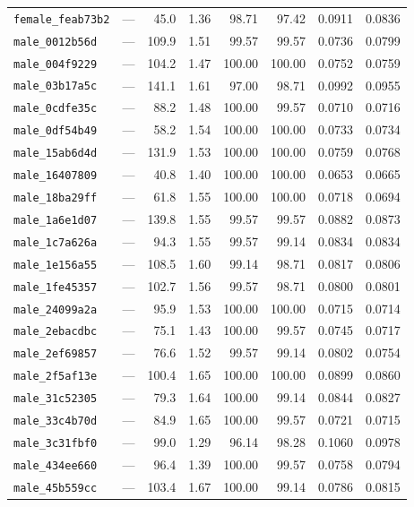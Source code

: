 \begin{longtable}{lrrrrrrr}
\texttt{female\_feab73b2} & --- & 45.0 & 1.36 & 98.71 & 97.42 & 0.0911 & 0.0836 \\
\texttt{male\_0012b56d} & --- & 109.9 & 1.51 & 99.57 & 99.57 & 0.0736 & 0.0799 \\
\texttt{male\_004f9229} & --- & 104.2 & 1.47 & 100.00 & 100.00 & 0.0752 & 0.0759 \\
\texttt{male\_03b17a5c} & --- & 141.1 & 1.61 & 97.00 & 98.71 & 0.0992 & 0.0955 \\
\texttt{male\_0cdfe35c} & --- & 88.2 & 1.48 & 100.00 & 99.57 & 0.0710 & 0.0716 \\
\texttt{male\_0df54b49} & --- & 58.2 & 1.54 & 100.00 & 100.00 & 0.0733 & 0.0734 \\
\texttt{male\_15ab6d4d} & --- & 131.9 & 1.53 & 100.00 & 100.00 & 0.0759 & 0.0768 \\
\texttt{male\_16407809} & --- & 40.8 & 1.40 & 100.00 & 100.00 & 0.0653 & 0.0665 \\
\texttt{male\_18ba29ff} & --- & 61.8 & 1.55 & 100.00 & 100.00 & 0.0718 & 0.0694 \\
\texttt{male\_1a6e1d07} & --- & 139.8 & 1.55 & 99.57 & 99.57 & 0.0882 & 0.0873 \\
\texttt{male\_1c7a626a} & --- & 94.3 & 1.55 & 99.57 & 99.14 & 0.0834 & 0.0834 \\
\texttt{male\_1e156a55} & --- & 108.5 & 1.60 & 99.14 & 98.71 & 0.0817 & 0.0806 \\
\texttt{male\_1fe45357} & --- & 102.7 & 1.56 & 99.57 & 98.71 & 0.0800 & 0.0801 \\
\texttt{male\_24099a2a} & --- & 95.9 & 1.53 & 100.00 & 100.00 & 0.0715 & 0.0714 \\
\texttt{male\_2ebacdbc} & --- & 75.1 & 1.43 & 100.00 & 99.57 & 0.0745 & 0.0717 \\
\texttt{male\_2ef69857} & --- & 76.6 & 1.52 & 99.57 & 99.14 & 0.0802 & 0.0754 \\
\texttt{male\_2f5af13e} & --- & 100.4 & 1.65 & 100.00 & 100.00 & 0.0899 & 0.0860 \\
\texttt{male\_31c52305} & --- & 79.3 & 1.64 & 100.00 & 99.14 & 0.0844 & 0.0827 \\
\texttt{male\_33c4b70d} & --- & 84.9 & 1.65 & 100.00 & 99.57 & 0.0721 & 0.0715 \\
\texttt{male\_3c31fbf0} & --- & 99.0 & 1.29 & 96.14 & 98.28 & 0.1060 & 0.0978 \\
\texttt{male\_434ee660} & --- & 96.4 & 1.39 & 100.00 & 99.57 & 0.0758 & 0.0794 \\
\texttt{male\_45b559cc} & --- & 103.4 & 1.67 & 100.00 & 99.14 & 0.0786 & 0.0815 \\

\end{longtable}
